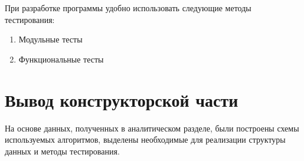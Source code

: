 При разработке программы удобно использовать следующие методы тестирования:

\begin{enumerate}
    \item Модульные тесты 
    \item Функциональные тесты 
\end{enumerate} 

\section{Вывод конструкторской части}\label{KonstructResult}
На основе данных, полученных в аналитическом разделе, были построены схемы используемых алгоритмов,
выделены необходимые для реализации структуры данных и методы тестирования.

